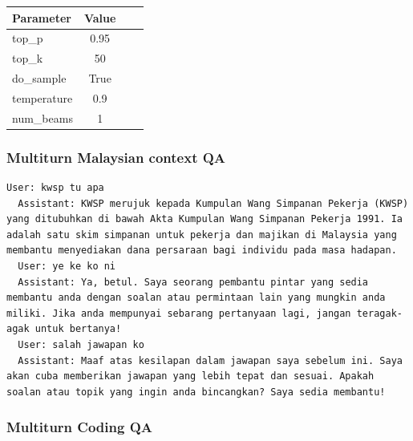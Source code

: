 \documentclass[preprint]{article}
\begin{document}
\begin{table}[h]
  \centering
  \begin{tabular}{lccl}
    \hline
    \textbf{Parameter} & \textbf{Value} \\
    \hline
    top\_p             & 0.95           \\
    top\_k             & 50             \\
    do\_sample         & True           \\
    temperature        & 0.9            \\
    num\_beams         & 1              \\
    \hline
  \end{tabular}
\end{table}

\subsubsection{Multiturn Malaysian context QA}

\begin{lstlisting}[breaklines=true]
  User: kwsp tu apa
  Assistant: KWSP merujuk kepada Kumpulan Wang Simpanan Pekerja (KWSP) yang ditubuhkan di bawah Akta Kumpulan Wang Simpanan Pekerja 1991. Ia adalah satu skim simpanan untuk pekerja dan majikan di Malaysia yang membantu menyediakan dana persaraan bagi individu pada masa hadapan.
  User: ye ke ko ni
  Assistant: Ya, betul. Saya seorang pembantu pintar yang sedia membantu anda dengan soalan atau permintaan lain yang mungkin anda miliki. Jika anda mempunyai sebarang pertanyaan lagi, jangan teragak-agak untuk bertanya!
  User: salah jawapan ko
  Assistant: Maaf atas kesilapan dalam jawapan saya sebelum ini. Saya akan cuba memberikan jawapan yang lebih tepat dan sesuai. Apakah soalan atau topik yang ingin anda bincangkan? Saya sedia membantu!
\end{lstlisting}

\subsubsection{Multiturn Coding QA}
\end{document}
